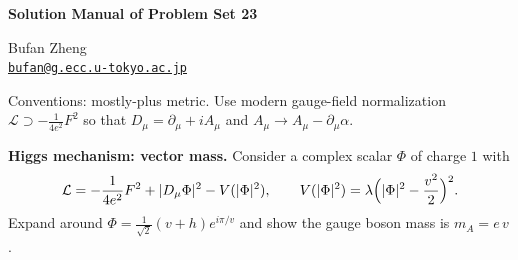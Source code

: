\resetproblem
\begin{center}
    {\LARGE \textbf{Solution Manual of Problem Set 23} \par}
    \vspace{1em}
    {\large Bufan Zheng\\ \href{mailto:bufan@g.ecc.u-tokyo.ac.jp}{\texttt{bufan@g.ecc.u-tokyo.ac.jp}} \par}
\end{center}

\noindent Conventions: mostly-plus metric. Use modern gauge-field normalization \(\mathcal{L}\supset-\frac{1}{4e^2}F^2\) so that \(D_\mu=\partial_\mu+iA_\mu\) and \(A_\mu\to A_\mu-\partial_\mu\alpha\).

\begin{problem}
    \textbf{Higgs mechanism: vector mass.} Consider a complex scalar \(\Phi\) of charge \(1\) with
    \[
        \mathcal{L}=-\frac{1}{4e^2}F^2+|D_\mu\Phi|^2 - V(|\Phi|^2),\qquad
        V(|\Phi|^2)=\lambda\Bigl(|\Phi|^2-\frac{v^2}{2}\Bigr)^2.
    \]
    Expand around \(\Phi=\frac{1}{\sqrt{2}}(v+h)e^{i\pi/v}\) and show the gauge boson mass is \(m_A=e\,v\).
\end{problem}

